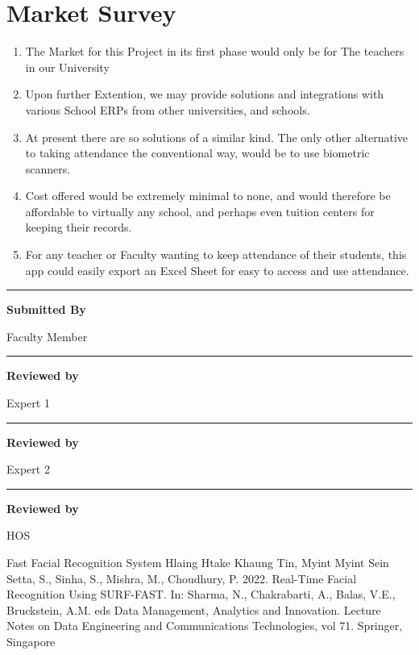 \documentclass[11pt]{article}
\newcommand\signature[2]{%
\noindent\begin{minipage}{3cm}
    \noindent\vspace{3cm}\par
    \noindent\rule{3cm}{1pt}\par
    \noindent\textbf{#1}\par
    \noindent#2%
\end{minipage}}
\begin{document}
\section{Market Survey}
\begin{enumerate}
    \item The Market for this Project in its first phase would only be for The teachers in our University
    \item Upon further Extention, we may provide solutions and integrations with various School ERPs from other universities, and schools. 
    \item At present there are so solutions of a similar kind. The only other alternative to taking attendance the conventional way, would be to use biometric scanners. 
    \item Cost offered would be extremely minimal to none, and would therefore be affordable to virtually any school, and perhaps even tuition centers for keeping their records. 
    \item For any teacher or Faculty wanting to keep attendance of their students, this app could easily export an Excel Sheet for easy to access and use attendance. 
\end{enumerate}

\vfill

\signature{Submitted By}{Faculty Member}\hfill\signature{Reviewed by}{Expert 1}\hfill\signature{Reviewed by}{Expert 2}\hfill\signature{Reviewed by}{HOS}


\pagebreak
\begin{thebibliography}{}


        Fast Facial Recognition System
Hlaing Htake Khaung Tin, Myint Myint Sein 
Setta, S., Sinha, S., Mishra, M., Choudhury, P. 2022. Real-Time Facial Recognition Using SURF-FAST. In: Sharma, N., Chakrabarti, A., Balas, V.E., Bruckstein, A.M. eds Data Management, Analytics and Innovation. Lecture Notes on Data Engineering and Communications Technologies, vol 71. Springer, Singapore


\end{thebibliography}
\end{document}
